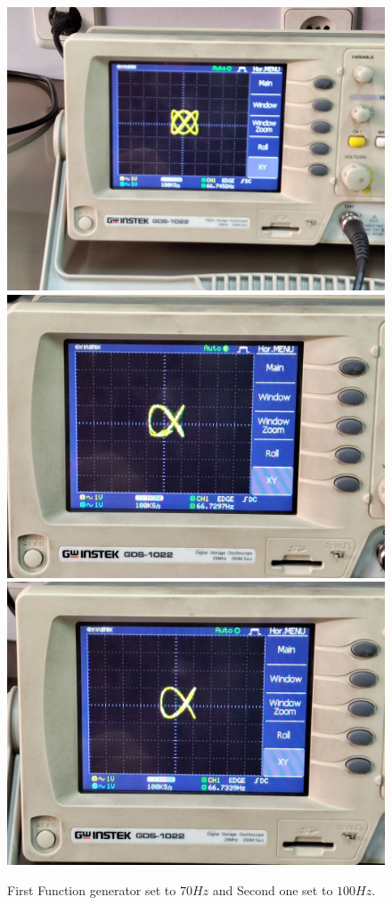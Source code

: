 \documentclass[11pt]{article}
\begin{document}
\begin{question}
{        \begin{figure}[H]
            \begin{center}
                \includegraphics[scale=0.1]{Fig/65.jpeg}
                \includegraphics[scale=0.1]{Fig/66.jpeg}
                \includegraphics[scale=0.1]{Fig/67.jpeg}
                \caption{First Function generator set to $70Hz$ and Second one set to $100Hz$.}
            \end{center}
        \end{figure}

}
\end{question}
\end{document}
